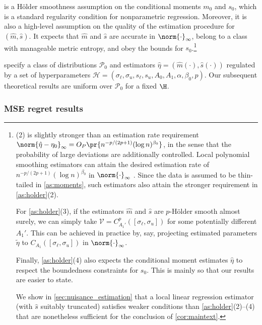 \documentclass[12pt, reqno]{amsart}
\newcommand{\sigl}{\sigma_\ell}
\newcommand{\sigu}{\sigma_u}
\newcommand{\Hyperparams}{\mathcal{H}}
\newcommand{\hatm}{\hat m}
\newcommand{\hats}{\hat s}
\newcommand{\hateta}{\hat\eta}
\numberwithin{equation}{section}
\begin{document}
 is a H\"older smoothness assumption on the conditional moments $m_0$ and
$s_0$, which is a standard regularity condition for nonparametric regression. Moreover, it
is also a high-level assumption on the quality of the estimation procedure for $(\hatm,
\hats)$. It expects that $\hatm$ and $\hats$ are accurate in $\norm{\cdot}_\infty$, belong
to a class with manageable metric entropy, and obey the bounds for $s_{0}$.\footnote{
  \label{fn:a4}(2) is slightly stronger than an
 estimation rate
 requirement $\norm{\hat\eta - \eta_0}_\infty = O_P\pr {n^{-p/(2p+1)}(\log n)^
 {\beta_0}}$, in the sense that the probability of large deviations are additionally
 controlled. Local polynomial smoothing estimators can attain the desired estimation rate
 of $n^{-p/(2p+1)}(\log n)^{\beta_0}$ in $\norm{\cdot}_\infty$
 \citep{tsybakov2008introduction,stone1980optimal}. Since the data is assumed to be thin-tailed in
 \cref{as:moments}, such estimators also attain the stronger requirement in
 \cref{as:holder}(2).

  For \cref{as:holder}(3), if the estimators $\hatm$ and $\hats$ are $p$-H\"older smooth
  almost surely,
  we can simply take $\mathcal V = C_{A_1'}^p([\sigl,\sigu])$ for some potentially
  different $A_1'$. This can be achieved in practice by, say, projecting estimated
  parameters $\tilde \eta$ to $C_{A_1}( [\sigl, \sigu])$ in $\norm
  {\cdot}_\infty$. 

  Finally,
 \cref{as:holder}(4) also expects the conditional moment estimates $\hateta$ to respect
 the boundedness constraints for $s_0$. This is mainly so that our results are easier to
 state.
 
 We show in \cref{sec:nuisance_estimation} that a local linear regression estimator (with
 $\hats$ suitably truncated) satisfies weaker conditions than \cref{as:holder}(2)--(4)
 that are nonetheless sufficient for the conclusion of \cref{cor:maintext}. 
}







 specify a class of distributions $\mathcal
P_0$ and estimators $\hateta = (\hatm(\cdot), \hats(\cdot))$ regulated by a set of
hyperparameters $\Hyperparams = (\sigl,
\sigu, s_\ell, s_u, A_0, A_1, \alpha, \beta_0, p).$ Our subsequent theoretical results are
 uniform over $\mathcal P_0$ for a fixed $\H$. %

\subsubsection{MSE regret results}
\end{document}
